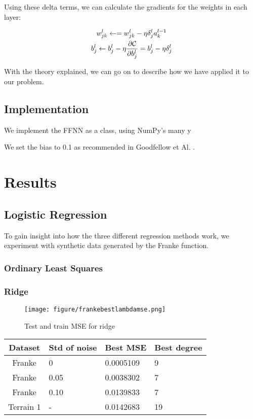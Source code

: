 \documentclass[onecolumn,10pt,cleanfoot]{asme2ej}
\begin{document}
Using these delta terms, we can calculate the gradients for the weights in each layer:

\begin{gather}
w_{jk}^l\leftarrow  = w_{jk}^l- \eta \delta_j^la_k^{l-1} \\
b_j^l \leftarrow b_j^l-\eta \frac{\partial {\cal C}}{\partial b_j^l}=b_j^l-\eta \delta_j^l
\end{gather}

With the theory explained, we can go on to describe how we have applied it to our problem.

\subsection{Implementation}

We implement the FFNN as a class, using NumPy's many y

We set the bias to 0.1 as recommended in Goodfellow et Al. \cite[189]{gbc}.

\section{Results}

\subsection{Logistic Regression}

To gain insight into how the three different regression methods work, we experiment with synthetic data generated by the Franke function.

\subsubsection{Ordinary Least Squares}

\subsubsection{Ridge}

\begin{figure}[h]
\centerline{\texttt{[image: figure/frankebestlambdamse.png]}}
\caption{Test and train MSE for ridge}
\label{frankebestlambdamse}
\end{figure}


\begin{table}
\begin{center}
\label{ols_mse_table_dif_data}
\begin{tabular}{c l l l}
Dataset & Std of noise & Best MSE & Best degree \\
\hline
Franke & 0 & 0.0005109 & 9\\
Franke & 0.05 & 0.0038302 & 7 \\
Franke & 0.10 & 0.0139833 & 7 \\
Terrain 1 & - & 0.0142683 & 19 \\
\hline
\end{tabular}
\end{center}
\end{table}
\end{document}
